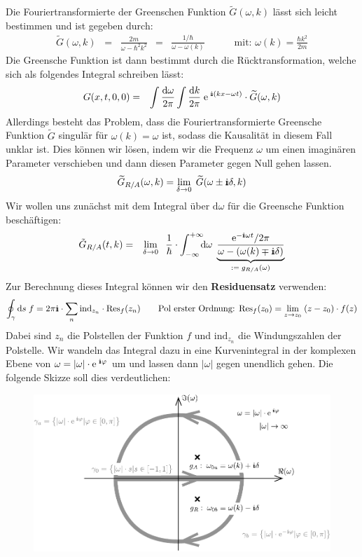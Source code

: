 Die Fouriertransformierte der Greenschen Funktion $\tilde{G}(\omega,k)$ lässt sich leicht bestimmen und ist gegeben durch: 
\begin{eqnarray*}
	\widetilde{G}(\omega,k) \;\;=\;\; \frac{2m}{\omega-\hbar^2k^2} &=& \frac{1/\hbar}{\omega-\omega(k)} \quad\qquad\text{mit: } \omega(k) = \frac{\hbar k^2}{2 m} 
\end{eqnarray*}
Die Greensche Funktion ist dann bestimmt durch die Rücktransformation, welche sich als folgendes Integral schreiben lässt: 
\begin{eqnarray*}
	G(x,t,0,0) &=& \int\frac{\mathrm{d}\omega}{2\pi}\int\frac{\mathrm{d}k}{2\pi}\;\e^{\;\I(kx-\omega t)}\cdot \widetilde{G}(\omega,k)
\end{eqnarray*}
Allerdings besteht das Problem, dass die Fouriertransformierte Greensche Funktion $\tilde{G}$ singulär für $\omega(k)=\omega$ ist, sodass die Kausalität in diesem Fall unklar ist. Dies können wir lösen, indem wir die Frequenz $\omega$ um einen imaginären  Parameter verschieben und dann diesen Parameter gegen Null gehen lassen. 
\begin{eqnarray*} 
	\widetilde{G}_{R/A}(\omega,k) = \lim_{\delta\to0}\;\widetilde{G}(\omega\pm\I\delta,k)
\end{eqnarray*} 
Wir wollen uns zunächst mit dem Integral über $\mathrm{d}\omega$ für die Greensche Funktion beschäftigen: 
\begin{eqnarray*}
	\tilde{G}_{R/A}(t,k) &=& \lim_{\delta\to0}\;\;\frac{1}{\hbar}\cdot \int_{-\infty}^{+\infty}\!\!\!\mathrm{d}\omega\;\underbrace{\frac{\e^{-\I\omega t}/2\pi}{\omega-(\omega(k)\mp\I\delta)}}_{:=\;g_{R/A}(\omega)}
\end{eqnarray*}
Zur Berechnung dieses Integral können wir den {\bf Residuensatz} verwenden: 
\begin{eqnarray*}
	\oint_{\gamma}\mathrm{d}s\;f = 2\pi\I\cdot\sum_n\mathrm{ind}_{z_n}\cdot\text{Res}_f(z_n) \qquad\text{Pol erster Ordnung: } \text{Res}_f(z_0)=\lim_{z\to z_0}\;(z-z_0)\cdot f(z)
\end{eqnarray*}
Dabei sind $z_n$ die Polstellen der Funktion $f$ und $\mathrm{ind}_{z_n}$ die Windungszahlen der Polstelle. Wir wandeln das Integral dazu in eine Kurvenintegral in der komplexen Ebene von $\omega=|\omega|\cdot\e^{\;\I\varphi}$ um und lassen dann $|\omega|$ gegen unendlich gehen. Die folgende Skizze soll dies verdeutlichen: 
\begin{figure}[h!]\centering
\includegraphics[scale=1]{Figs/komplexeebene}
\end{figure}

